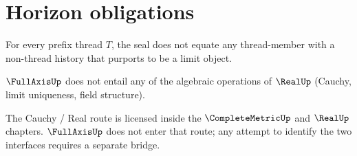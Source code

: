 \section{Horizon obligations}

\begin{theorem}
\label{thm:fullaxis-boundary-marker-not-limit}
For every prefix thread \(T\), the seal does not equate any thread-member with a non-thread history that purports to be a limit object.
\end{theorem}

\begin{theorem}
\label{thm:fullaxis-not-real-horizon}
\(\FullAxisUp\) does not entail any of the algebraic operations of \(\RealUp\) (Cauchy, limit uniqueness, field structure).
\end{theorem}

\begin{remark}
The Cauchy / Real route is licensed inside the \(\CompleteMetricUp\) and \(\RealUp\) chapters. \(\FullAxisUp\) does not enter that route; any attempt to identify the two interfaces requires a separate bridge.
\end{remark}
